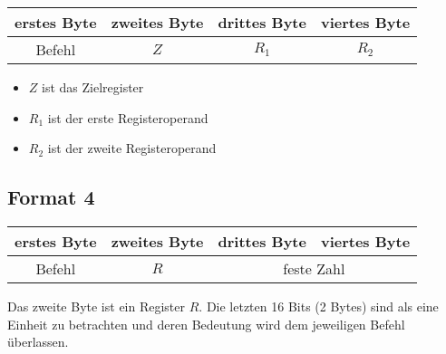 \begin{center}
  \begin{tabular}{|*{4}{c|}}
    \hline
    erstes Byte   & zweites Byte  & drittes Byte  & viertes Byte
    \\\hline\hline
    Befehl        & $Z$ & $R_{1}$ & $R_{2}$ 
    \\\hline
  \end{tabular}
\end{center}

\begin{itemize}
  \item $Z$ ist das Zielregister
  \item $R_{1}$ ist der erste Registeroperand
  \item $R_{2}$ ist der zweite Registeroperand
\end{itemize}


\subsection{Format 4}

\begin{center}
  \begin{tabular}{|*{4}{c|}}
    \hline
    erstes Byte   & zweites Byte  & drittes Byte  & viertes Byte
    \\\hline\hline
    Befehl        & $R$ & \multicolumn{2}{c|}{feste Zahl}
    \\\hline
  \end{tabular}
\end{center}
Das zweite Byte ist ein Register $R$. Die letzten 16 Bits (2 Bytes) sind als eine
Einheit zu betrachten und deren Bedeutung wird dem jeweiligen Befehl überlassen.
